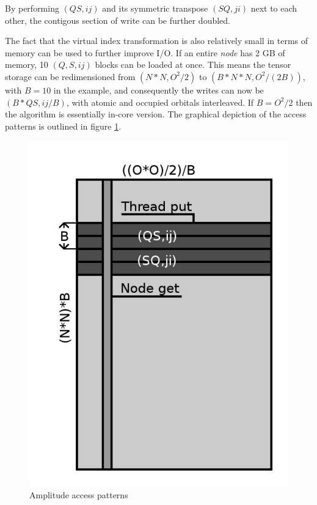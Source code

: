 \documentclass[12pt]{article} \usepackage[margin=1in]{geometry}
\begin{document}
By performing $(QS,ij)$ and its symmetric transpose $(SQ,ji)$ next to
each other, the contigous section of write can be further doubled.

The fact that the virtual index transformation is also relatively
small in terms of memory can be used to further improve I/O.  If an
entire {\it node} has 2 GB of memory, 10 $(Q,S,ij)$ blocks can be
loaded at once.  This means the tensor storage can be redimensioned
from $(N*N,O^2/2)$ to $(B*N*N,O^2/(2B))$, with $B=10$ in the example,
and consequently the writes can now be $(B*QS,ij/B)$, with atomic and
occupied orbitals interleaved.  If $B = O^2/2$ then the algorithm is
essentially in-core version. 
The graphical depiction of the access patterns is outlined in figure
\ref{patterns}.

\begin{figure}[here]
\begin{center}
\includegraphics[scale=0.25]{figure.pdf}
\caption{Amplitude access patterns}
\label{patterns}
\end{center}
\end{figure}
\end{document}
